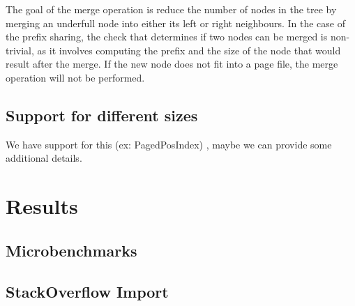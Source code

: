 \documentclass[11pt,a4paper,oneside]{article}
\begin{document}
The goal of the merge operation is reduce the number of nodes in the tree by merging an underfull node into either its left or right neighbours. In the case of the prefix sharing, the check that determines if two nodes can be merged is non-trivial, as it involves computing the prefix and the size of the node that would result after the merge. If the new node does not fit into a page file, the merge operation will not be performed.

\subsection{Support for different sizes}
We have support for this (ex: PagedPosIndex) , maybe we can provide some additional details.



\section{Results}
% 
% 
% 
% 
\subsection{Microbenchmarks} %
\label{sub:microbenchmarks}


\subsection{StackOverflow Import} %
\label{sub:stackoverflow_import}
\end{document}
